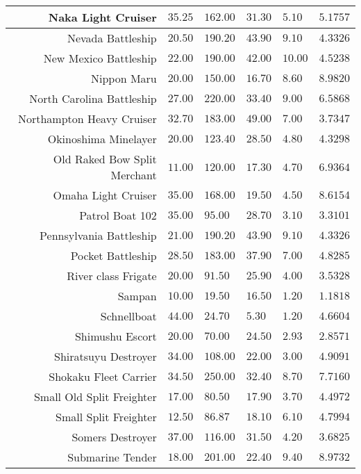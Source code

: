 \documentclass{article}
\begin{document}
\begin{tabularx}{\textwidth}{|r|l|l|l|l|X|}
\hline
Naka Light Cruiser & $35.25$ & $162.00$ & $31.30$ & $5.10$ & $5.1757$ \\
\hline
Nevada Battleship & $20.50$ & $190.20$ & $43.90$ & $9.10$ & $4.3326$ \\
\hline
New Mexico Battleship & $22.00$ & $190.00$ & $42.00$ & $10.00$ & $4.5238$ \\
\hline
Nippon Maru & $20.00$ & $150.00$ & $16.70$ & $8.60$ & $8.9820$ \\
\hline
North Carolina Battleship & $27.00$ & $220.00$ & $33.40$ & $9.00$ & $6.5868$ \\
\hline
Northampton Heavy Cruiser & $32.70$ & $183.00$ & $49.00$ & $7.00$ & $3.7347$ \\
\hline
Okinoshima Minelayer & $20.00$ & $123.40$ & $28.50$ & $4.80$ & $4.3298$ \\
\hline
Old Raked Bow Split Merchant & $11.00$ & $120.00$ & $17.30$ & $4.70$ & $6.9364$ \\
\hline
Omaha Light Cruiser & $35.00$ & $168.00$ & $19.50$ & $4.50$ & $8.6154$ \\
\hline
Patrol Boat 102 & $35.00$ & $95.00$ & $28.70$ & $3.10$ & $3.3101$ \\
\hline
Pennsylvania Battleship & $21.00$ & $190.20$ & $43.90$ & $9.10$ & $4.3326$ \\
\hline
Pocket Battleship & $28.50$ & $183.00$ & $37.90$ & $7.00$ & $4.8285$ \\
\hline
River class Frigate & $20.00$ & $91.50$ & $25.90$ & $4.00$ & $3.5328$ \\
\hline
Sampan & $10.00$ & $19.50$ & $16.50$ & $1.20$ & $1.1818$ \\
\hline
Schnellboat & $44.00$ & $24.70$ & $5.30$ & $1.20$ & $4.6604$ \\
\hline
Shimushu Escort & $20.00$ & $70.00$ & $24.50$ & $2.93$ & $2.8571$ \\
\hline
Shiratsuyu Destroyer & $34.00$ & $108.00$ & $22.00$ & $3.00$ & $4.9091$ \\
\hline
Shokaku Fleet Carrier & $34.50$ & $250.00$ & $32.40$ & $8.70$ & $7.7160$ \\
\hline
Small Old Split Freighter & $17.00$ & $80.50$ & $17.90$ & $3.70$ & $4.4972$ \\
\hline
Small Split Freighter & $12.50$ & $86.87$ & $18.10$ & $6.10$ & $4.7994$ \\
\hline
Somers Destroyer & $37.00$ & $116.00$ & $31.50$ & $4.20$ & $3.6825$ \\
\hline
Submarine Tender & $18.00$ & $201.00$ & $22.40$ & $9.40$ & $8.9732$ \\

\end{tabularx}
\end{document}
